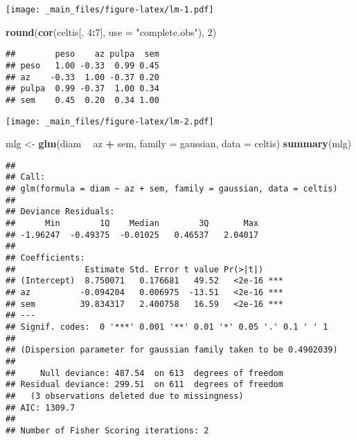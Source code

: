 \documentclass[
]{book}
\newenvironment{Shaded}{\begin{snugshade}}{\end{snugshade}}
\newcommand{\DataTypeTok}[1]{\textcolor[rgb]{0.13,0.29,0.53}{#1}}
\newcommand{\DecValTok}[1]{\textcolor[rgb]{0.00,0.00,0.81}{#1}}
\newcommand{\KeywordTok}[1]{\textcolor[rgb]{0.13,0.29,0.53}{\textbf{#1}}}
\newcommand{\NormalTok}[1]{#1}
\newcommand{\OperatorTok}[1]{\textcolor[rgb]{0.81,0.36,0.00}{\textbf{#1}}}
\newcommand{\StringTok}[1]{\textcolor[rgb]{0.31,0.60,0.02}{#1}}
\begin{document}
\texttt{[image: \_main\_files/figure-latex/lm-1.pdf]}

\begin{Shaded}
\begin{Highlighting}[]
\KeywordTok{round}\NormalTok{(}\KeywordTok{cor}\NormalTok{(celtis[, }\DecValTok{4}\OperatorTok{:}\DecValTok{7}\NormalTok{], }\DataTypeTok{use =} \StringTok{"complete.obs"}\NormalTok{), }\DecValTok{2}\NormalTok{)}
\end{Highlighting}
\end{Shaded}

\begin{verbatim}
##        peso    az pulpa  sem
## peso   1.00 -0.33  0.99 0.45
## az    -0.33  1.00 -0.37 0.20
## pulpa  0.99 -0.37  1.00 0.34
## sem    0.45  0.20  0.34 1.00
\end{verbatim}

\begin{Shaded}
\end{Shaded}

\texttt{[image: \_main\_files/figure-latex/lm-2.pdf]}

\begin{Shaded}
\begin{Highlighting}[]
\NormalTok{mlg <-}\StringTok{ }\KeywordTok{glm}\NormalTok{(diam }\OperatorTok{~}\StringTok{ }\NormalTok{az }\OperatorTok{+}\StringTok{ }\NormalTok{sem, }\DataTypeTok{family =}\NormalTok{ gaussian, }\DataTypeTok{data =}\NormalTok{ celtis)}
\KeywordTok{summary}\NormalTok{(mlg)}
\end{Highlighting}
\end{Shaded}

\begin{verbatim}
## 
## Call:
## glm(formula = diam ~ az + sem, family = gaussian, data = celtis)
## 
## Deviance Residuals: 
##      Min        1Q    Median        3Q       Max  
## -1.96247  -0.49375  -0.01025   0.46537   2.04017  
## 
## Coefficients:
##              Estimate Std. Error t value Pr(>|t|)    
## (Intercept)  8.750071   0.176681   49.52   <2e-16 ***
## az          -0.094204   0.006975  -13.51   <2e-16 ***
## sem         39.834317   2.400758   16.59   <2e-16 ***
## ---
## Signif. codes:  0 '***' 0.001 '**' 0.01 '*' 0.05 '.' 0.1 ' ' 1
## 
## (Dispersion parameter for gaussian family taken to be 0.4902039)
## 
##     Null deviance: 487.54  on 613  degrees of freedom
## Residual deviance: 299.51  on 611  degrees of freedom
##   (3 observations deleted due to missingness)
## AIC: 1309.7
## 
## Number of Fisher Scoring iterations: 2
\end{verbatim}
\end{document}
